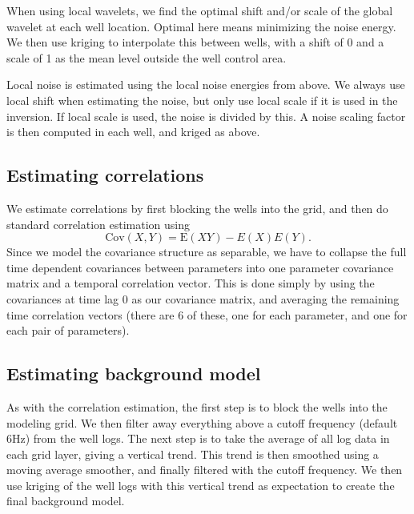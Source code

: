 When using local wavelets, we find the optimal shift and/or scale of the global wavelet at each well location. Optimal here means minimizing the noise energy. We then use kriging to interpolate this between wells, with a shift of 0 and a scale of 1 as the mean level outside the well control area.

Local noise is estimated using the local noise energies from above. We always use local shift when estimating the noise, but only use local scale if it is used in the inversion. If local scale is used, the noise is divided by this. A noise scaling factor is then computed in each well, and kriged as above.

\subsection{Estimating correlations}
\label{sec:correstimp}
We estimate correlations by first blocking the wells into the grid, and then do standard correlation estimation using
\begin{equation}
\text{Cov}(X,Y) = \text{E}(XY)-E(X)E(Y).
\end{equation}
Since we model the covariance structure as separable, we have to collapse the full time dependent covariances between parameters into one parameter covariance matrix and a temporal correlation vector. This is done simply by using the covariances at time lag 0 as our covariance matrix, and averaging the remaining time correlation vectors (there are 6 of these, one for each parameter, and one for each pair of parameters).

\subsection{Estimating background model}
As with the correlation estimation, the first step is to block the wells into the modeling grid. We then filter away everything above a cutoff frequency (default 6Hz) from the well logs. The next step is to take the average of all log data in each grid layer, giving a vertical trend. This trend is then smoothed using a moving average smoother, and finally filtered with the cutoff frequency. We then use kriging of the well logs with this vertical trend as expectation to create the final background model.

